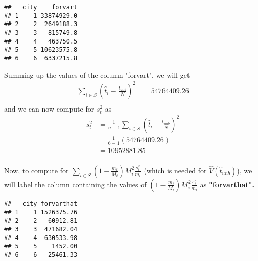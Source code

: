 \documentclass[]{article}
\newenvironment{Shaded}{\begin{snugshade}}{\end{snugshade}}
\newcommand{\AttributeTok}[1]{\textcolor[rgb]{0.13,0.29,0.53}{#1}}
\newcommand{\DecValTok}[1]{\textcolor[rgb]{0.00,0.00,0.81}{#1}}
\newcommand{\FunctionTok}[1]{\textcolor[rgb]{0.13,0.29,0.53}{\textbf{#1}}}
\newcommand{\NormalTok}[1]{#1}
\newcommand{\OtherTok}[1]{\textcolor[rgb]{0.56,0.35,0.01}{#1}}
\newcommand{\SpecialCharTok}[1]{\textcolor[rgb]{0.81,0.36,0.00}{\textbf{#1}}}
\begin{document}
\begin{verbatim}
##   city    forvart
## 1    1 33874929.0
## 2    2  2649188.3
## 3    3   815749.8
## 4    4   463750.5
## 5    5 10623575.8
## 6    6  6337215.8
\end{verbatim}

Summing up the values of the column "forvart", we will get 
\[
\begin{aligned}
\sum_{i \in S}\left(\hat t_i - \frac{\hat t_{unb}}{N}\right)^2 &= 54764409.26 \\
\end{aligned}
\]
and we can now compute for $s_t^2$ as
\[
\begin{aligned}
 s_t^2 &= \frac{1}{n-1}\sum_{i \in S}\left(\hat t_i - \frac{\hat t_{unb}}{N}\right)^2 \\
 &= \frac{1}{6-1}(54764409.26) \\
 &= 10952881.85
\end{aligned}
\]
\\
Now, to compute for $\sum_{i \in S}\left(1 - \frac{m_i}{M_i}\right)M_i^2\frac{s_i^2}{m_i}$ (which is needed for $\hat V(\hat t_{unb})$), we will label the column containing the values of $\left(1 - \frac{m_i}{M_i}\right)M_i^2\frac{s_i^2}{m_i}$ as \textbf{"forvarthat".} \\

\begin{Shaded}
\end{Shaded}

\begin{verbatim}
##   city forvarthat
## 1    1 1526375.76
## 2    2   60912.81
## 3    3  471682.04
## 4    4  630533.98
## 5    5    1452.00
## 6    6   25461.33
\end{verbatim}
\end{document}
